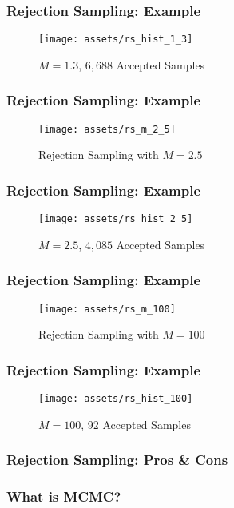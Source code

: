 \documentclass{beamer}
\begin{document}
\begin{frame}
  \frametitle{Rejection Sampling: Example}
  \begin{figure}
    \centering
    \texttt{[image: assets/rs\_hist\_1\_3]}
    \caption{$M = 1.3$, $6,688$ Accepted Samples}
  \end{figure}
\end{frame}

\begin{frame}
  \frametitle{Rejection Sampling: Example}
  \begin{figure}
    \centering
    \texttt{[image: assets/rs\_m\_2\_5]}
    \caption{Rejection Sampling with $M = 2.5$}
  \end{figure}
\end{frame}

\begin{frame}
  \frametitle{Rejection Sampling: Example}
  \begin{figure}
    \centering
    \texttt{[image: assets/rs\_hist\_2\_5]}
    \caption{$M = 2.5$, $4,085$ Accepted Samples}
  \end{figure}
\end{frame}

\begin{frame}
  \frametitle{Rejection Sampling: Example}
  \begin{figure}
    \centering
    \texttt{[image: assets/rs\_m\_100]}
    \caption{Rejection Sampling with $M = 100$}
  \end{figure}
\end{frame}

\begin{frame}
  \frametitle{Rejection Sampling: Example}
  \begin{figure}
    \centering
    \texttt{[image: assets/rs\_hist\_100]}
    \caption{$M = 100$, $92$ Accepted Samples}
  \end{figure}
\end{frame}


\begin{frame}
\frametitle{Rejection Sampling: Pros \& Cons}
\end{frame}




\begin{frame}
\frametitle{What is MCMC?}
\end{frame}
\end{document}
